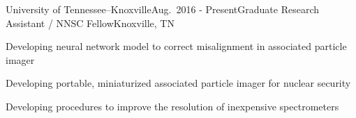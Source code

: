 
\begin{rSubsection}{University of Tennessee--Knoxville}{Aug.\ 2016 - Present}{Graduate Research Assistant / NNSC Fellow}{Knoxville, TN}
\item Developing neural network model to correct misalignment in associated particle imager
\item Developing portable, miniaturized associated particle imager for nuclear security
\item Developing procedures to improve the resolution of inexpensive spectrometers
\end{rSubsection}





